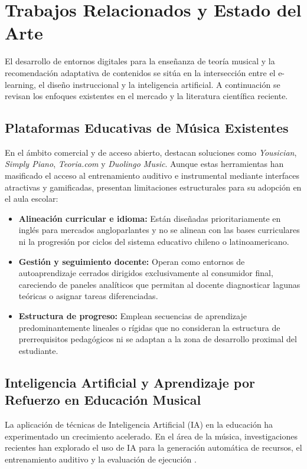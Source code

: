 \section{Trabajos Relacionados y Estado del Arte}

El desarrollo de entornos digitales para la enseñanza de teoría musical y la recomendación adaptativa de contenidos se sitúa en la intersección entre el e-learning, el diseño instruccional y la inteligencia artificial. A continuación se revisan los enfoques existentes en el mercado y la literatura científica reciente.

\subsection{Plataformas Educativas de Música Existentes}
En el ámbito comercial y de acceso abierto, destacan soluciones como \textit{Yousician}, \textit{Simply Piano}, \textit{Teoria.com} y \textit{Duolingo Music}. Aunque estas herramientas han masificado el acceso al entrenamiento auditivo e instrumental mediante interfaces atractivas y gamificadas, presentan limitaciones estructurales para su adopción en el aula escolar:
\begin{itemize}
    \item \textbf{Alineación curricular e idioma:} Están diseñadas prioritariamente en inglés para mercados angloparlantes y no se alinean con las bases curriculares ni la progresión por ciclos del sistema educativo chileno o latinoamericano.
    \item \textbf{Gestión y seguimiento docente:} Operan como entornos de autoaprendizaje cerrados dirigidos exclusivamente al consumidor final, careciendo de paneles analíticos que permitan al docente diagnosticar lagunas teóricas o asignar tareas diferenciadas.
    \item \textbf{Estructura de progreso:} Emplean secuencias de aprendizaje predominantemente lineales o rígidas que no consideran la estructura de prerrequisitos pedagógicos ni se adaptan a la zona de desarrollo proximal del estudiante.
\end{itemize}

\subsection{Inteligencia Artificial y Aprendizaje por Refuerzo en Educación Musical}
La aplicación de técnicas de Inteligencia Artificial (IA) en la educación ha experimentado un crecimiento acelerado. En el área de la música, investigaciones recientes han explorado el uso de IA para la generación automática de recursos, el entrenamiento auditivo y la evaluación de ejecución \cite{garcia2025}.

